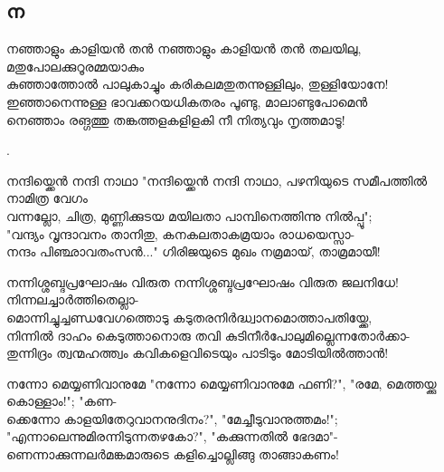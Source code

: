 \subsection{ന}
\begin{enumerate}

\begin{slokam}{\VSr}{\PG}{നഞ്ഞാളും കാളിയൻ തൻ}
 നഞ്ഞാളും കാളിയൻ തൻ തലയിലു, മതുപോലക്കുറൂരമ്മയാകും\\
കുഞ്ഞാത്തോൽ പാലുകാച്ചും കരികലമതുതന്നുള്ളിലും, തുള്ളിയോനേ!\\
ഇഞ്ഞാനെന്നുള്ള ഭാവക്കറയധികതരം പൂണ്ടു, മാലാണ്ടുപോമെൻ\\
നെഞ്ഞാം രങ്ഗത്തു തങ്കത്തളകളിളകി നീ നിത്യവും നൃത്തമാടൂ!
\end{slokam}


.

\begin{slokam}{\VSr}{\VKG}{നന്ദിയ്ക്കെൻ നന്ദി നാഥാ}
"നന്ദിയ്ക്കെൻ നന്ദി നാഥാ, പഴനിയുടെ സമീപത്തിൽ നാമിത്ര വേഗം\\
വന്നല്ലോ, ചിത്ര, മുണ്ണിക്കുടയ മയിലതാ പാമ്പിനെത്തിന്നു നിൽപ്പൂ";\\
"വന്ദ്യം വൃന്ദാവനം താനിതു, കനകലതാകമ്രയാം രാധയെസ്സാ-\\
നന്ദം പിഞ്ഛാവതംസൻ..." ഗിരിജയുടെ മുഖം നമ്രമായ്‌, താമ്രമായീ!
\end{slokam}



\begin{slokam}{\VSr}{\ARSK}{നന്നിശ്ശബ്ദപ്രഘോഷം വിരുത}
നന്നിശ്ശബ്ദപ്രഘോഷം വിരുത ജലനിധേ! നിന്നലച്ചാർത്തിതെല്ലാ-\\
മൊന്നിച്ചുച്ചണ്ഡവേഗത്തൊടു കടുതരനിർദ്ധ്വാനമൊത്താപതിയ്ക്കേ,\\
നിന്നിൽ ദാഹം കെടുത്താനൊരു തവി കുടിനീർപോലുമില്ലെന്നതോർക്കാ-\\
തുന്നിദ്രം ത്വന്മഹത്ത്വം കവികളെവിടെയും പാടിടും മോടിയിൽത്താൻ!
\end{slokam}



\begin{slokam}{\VSv}{\KAM}{നന്നോ മെയ്യണിവാനുമേ}
 "നന്നോ മെയ്യണിവാനുമേ ഫണി?", "രമേ, മെത്തയ്ക്കു കൊള്ളാം!"; "കണ-\\
ക്കെന്നോ കാളയിതേറുവാനനുദിനം?", "മേച്ചീടുവാനുത്തമം!";\\
"എന്നാലെന്നുമിരന്നിടുന്നതഴകോ?", "കക്കുന്നതിൽ ഭേദമാ"-\\
ണെന്നാക്കുന്നലർമങ്കമാരുടെ കളിച്ചൊല്ലിങ്ങു താങ്ങാകണം!
\end{slokam}


\end{enumerate}
